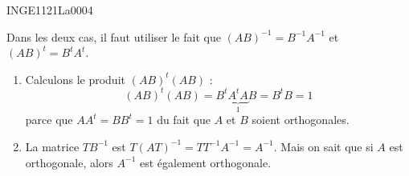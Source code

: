 

\begin{corrige}{INGE1121La0004}

	Dans les deux cas, il faut utiliser le fait que $(AB)^{-1}=B^{-1} A^{-1}$ et $(AB)^t=B^tA^t$.
	\begin{enumerate}

		\item
			Calculons le produit $(AB)^t(AB)$ :
			\begin{equation}
				(AB)^t(AB)=B^t\underbrace{A^tA}_{1}B=B^tB=1
			\end{equation}
			parce que $AA^t=BB^t=1$ du fait que $A$ et $B$ soient orthogonales.
		\item
			La matrice $TB^{-1}$ est $T(AT)^{-1}=TT^{-1}A^{-1}=A^{-1}$. Mais on sait que si $A$ est orthogonale, alors $A^{-1}$ est également orthogonale.
	\end{enumerate}

\end{corrige}
